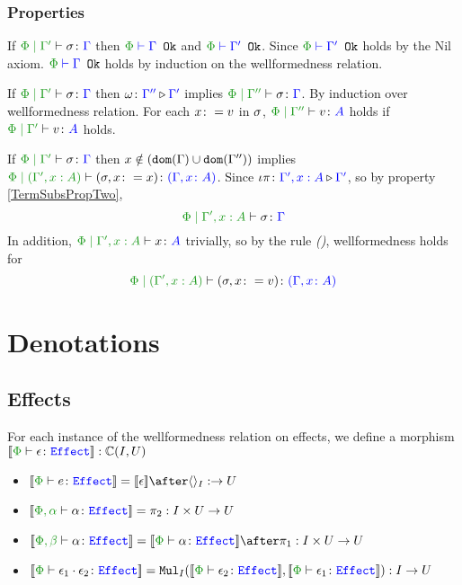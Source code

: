 \documentclass{report}
\begin{document}
    \subsection{Properties}
        \begin{property}[Wellformedness]\label{TermSubsPropOne}
            If $\etyperelation{\P}{\G'}{\si}{\G}$ then $\wellformedok{\P}{\G}$ and $\wellformedok{\P}{\G'}$. 
            Since $\wellformedok{\P}{\G'}$ holds by the Nil axiom. $\wellformedok{\P}{\G}$ holds by induction on the wellformedness relation.
        \end{property}

        \begin{property}[Weakening]\label{TermSubsPropTwo}
            If $\etyperelation{\P}{\G'}{\si}{\G}$ then $\omega \colon {\color{blue}\Gamma''} \triangleright {\color {blue} \Gamma'}$ implies $\etyperelation{\P}{\G''}{\si}{\G}$. 
            By induction over wellformedness relation. For each $x\colon= v$ in $\sigma$, $\etyperelation{\P}{\G''}{v}{A}$ holds if $\etyperelation{\P}{\G'}{v}{A}$ holds.
        \end{property}

        \begin{property}[Extension]\label{TermSubsPropThree}
            If $\etyperelation{\P}{\G'}{\si}{\G}$ then $x \notin (\texttt{dom}(\Gamma) \cup \texttt{dom}(\Gamma''))$ implies $\etyperelation{\P}{(\G', x: A)}{(\si, x \setto x)}{(\gax)}$. Since $\iota\pi \colon {\color{blue}\Gamma',x: A} \triangleright {\color {blue} \Gamma'}$, so by property \ref{TermSubsPropTwo}, 
            $$\etyperelation{\P}{\G', x: A}{\si}{\G}$$
            In addition, $\etyperelation{\P}{\G', x: A}{x}{A}$ trivially, so by the rule \textit{(\tsubextend)}, wellformedness holds for
            \begin{equation}
                \etyperelation{\P}{(\G', x:A)}{(\si, x\setto v)}{(\gax)}
            \end{equation}
        \end{property}


\chapter{Denotations}
\section{Effects}
For each instance of the wellformedness relation on effects, we define a morphism $\deno{\typerelation{\P}{\e}{\effect}}: \ciu$

\begin{itemize}
    \item $\deno{\typerelation{\P}{e}{\effect}} = \deno{\e} \after \term{I}: \rightarrow U$
    \item $\deno{\typerelation{\P,\a}{\a}{\effect}} = \pp: I\times U \rightarrow U$
    
    \item $\deno{\typerelation{\P, \b}{\a}{\effect}} = \deno{\typerelation{\P}{\a}{\effect}}\after\p: I\times U\rightarrow U$
    
    \item $\deno{\typerelation{\P}{\e_1\dot \e_2}{\effect}} = \Mul_I(\deno{\typerelation{\P}{\e_2}{\effect}},\deno{\typerelation{\P}{\e_1}{\effect}}): I \rightarrow U$
\end{itemize}
\end{document}
